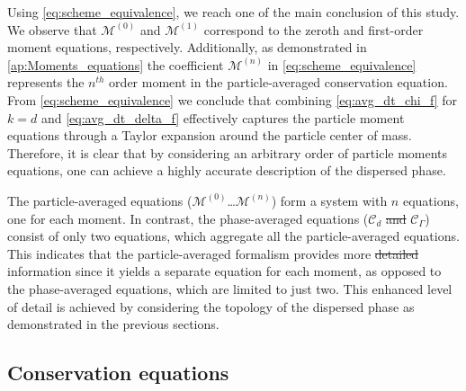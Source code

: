 \documentclass[11pt]{My_preprint}
\providecommand{\DIFadd}[1]{{\protect\color{blue}\uwave{#1}}} %
\providecommand{\DIFdel}[1]{{\protect\color{red}\sout{#1}}}                      %
\providecommand{\DIFaddbegin}{} %
\providecommand{\DIFaddend}{} %
\providecommand{\DIFdelbegin}{} %
\providecommand{\DIFdelend}{} %
\begin{document}
Using \ref{eq:scheme_equivalence}, we reach one of the main conclusion of this study. 
We observe that $\mathcal{M}^{(0)}$ and $\mathcal{M}^{(1)}$ correspond to the zeroth and first-order moment equations, respectively. 
Additionally, as demonstrated in \ref{ap:Moments_equations} the coefficient $\mathcal{M}^{(n)}$ in \ref{eq:scheme_equivalence} represents the $n^{th}$ order moment in the particle-averaged conservation equation. 
From \ref{eq:scheme_equivalence} we conclude that combining \ref{eq:avg_dt_chi_f} for $k=d$ and \ref{eq:avg_dt_delta_f} effectively captures the particle moment equations through a Taylor expansion around the particle center of mass. 
Therefore, it is clear that by considering an arbitrary order of particle moments equations, one can achieve a highly accurate description of the dispersed phase.


The particle-averaged equations ($\mathcal{M}^{(0)}$\ldots $\mathcal{M}^{(n)}$) form a system with $n$ equations, one for each moment. 
In contrast, the \DIFaddbegin \DIFadd{dispersed }\DIFaddend phase-averaged equations ($\mathcal{C}_d$ \DIFdelbegin \DIFdel{and }\DIFdelend \DIFaddbegin \DIFadd{+ }\DIFaddend $\mathcal{C}_\Gamma$) consist of only two equations, which aggregate all the particle-averaged equations. 
This indicates that the particle-averaged formalism provides more \DIFdelbegin \DIFdel{detailed }\DIFdelend information since it yields a separate equation for each moment, as opposed to the phase-averaged equations, which are limited to just two. 
This enhanced level of detail is achieved by considering the topology of the dispersed phase as demonstrated in the previous sections.












\subsection{Conservation equations}
\end{document}
